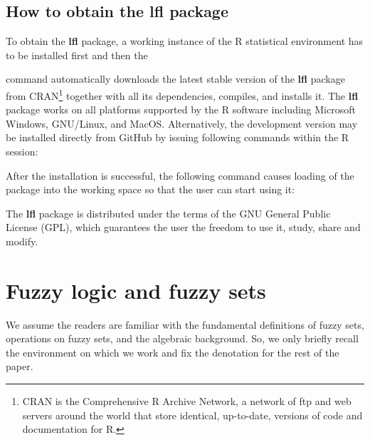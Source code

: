 \documentclass[review]{elsarticle}
\newcommand{\pkg}[1]{\textbf{#1}}
\newcommand{\proglang}[1]{#1}
\newcommand{\R}{\proglang{R}}
\begin{document}
\subsection[How to obtain the lfl package]{How to obtain the \pkg{lfl} package} \label{sec:obtaining}

To obtain the \pkg{lfl} package, a working instance of the \R{} statistical environment has to be installed
first and then the
%

%
command automatically downloads the latest stable version of the \pkg{lfl} package from CRAN\footnote{CRAN is the Comprehensive R Archive Network, a network of ftp and web servers around the world that store identical, up-to-date, versions of code and documentation for R.}
together with all its dependencies, compiles, and installs it.
The \pkg{lfl} package works on all platforms supported by
the \R{} software including Microsoft Windows, GNU/Linux, and MacOS. Alternatively, the development
version may be installed directly from GitHub by issuing following commands within the R session:
%

%
After the installation is successful, the following command
causes loading of the package into the working space so that the user can start using it:
%


The \pkg{lfl} package is distributed under the terms of the GNU General Public License (GPL), which guarantees the user the freedom to use it, study, share and modify.







\section{Fuzzy logic and fuzzy sets}
\label{sec:fuzzysets}

We assume the readers are familiar with the fundamental definitions of fuzzy sets, operations on fuzzy sets, and the algebraic background. So, we only briefly recall the environment on which we work and fix the denotation for the rest of the paper. 
\end{document}
